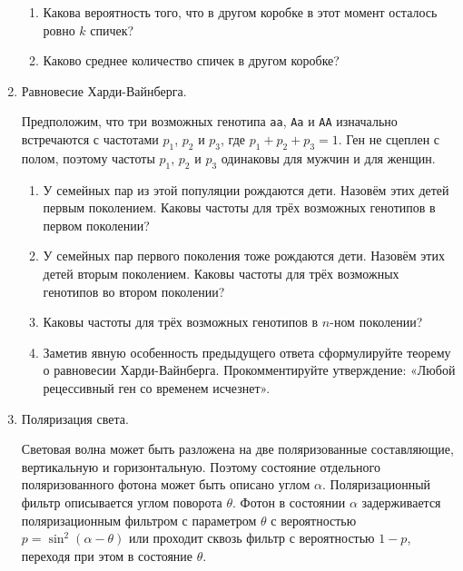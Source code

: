\documentclass[nobib]{tufte-handout}
\begin{document}
\begin{enumerate}
\begin{enumerate}
\item Какова вероятность того, что в другом коробке в этот момент осталось ровно $k$ спичек?
\item Каково среднее количество спичек в другом коробке?
\end{enumerate}


\item Равновесие Харди-Вайнберга. 

Предположим, что три возможных генотипа \verb|aa|, \verb|Aa| и \verb|AA| изначально встречаются с частотами $p_1$, $p_2$ и $p_3$, где $p_1+p_2+p_3=1$. Ген не сцеплен с полом, поэтому частоты $p_1$, $p_2$ и $p_3$ одинаковы для мужчин и для женщин. 
\begin{enumerate}
\item У семейных пар из этой популяции рождаются дети. Назовём этих детей первым поколением. Каковы частоты для трёх возможных генотипов в первом поколении? 
\item У семейных пар первого поколения тоже рождаются дети. Назовём этих детей вторым поколением. Каковы частоты для трёх возможных генотипов во втором поколении? 
\item Каковы частоты для трёх возможных генотипов в $n$-ном поколении?
\item Заметив явную особенность предыдущего ответа сформулируйте теорему о равновесии Харди-Вайнберга. Прокомментируйте утверждение: «Любой рецессивный ген со временем исчезнет».
\end{enumerate}

\item Поляризация света.

Световая волна может быть разложена на две поляризованные составляющие, вертикальную и горизонтальную. Поэтому состояние отдельного поляризованного фотона может быть описано углом $\alpha$. Поляризационный фильтр описывается углом поворота $\theta$. Фотон в состоянии $\alpha$ задерживается поляризационным фильтром с параметром $\theta$ с вероятностью $p=\sin^2(\alpha-\theta)$ или проходит сквозь фильтр с вероятностью $1-p$, переходя при этом в состояние $\theta$. 


\end{enumerate}
\end{document}
